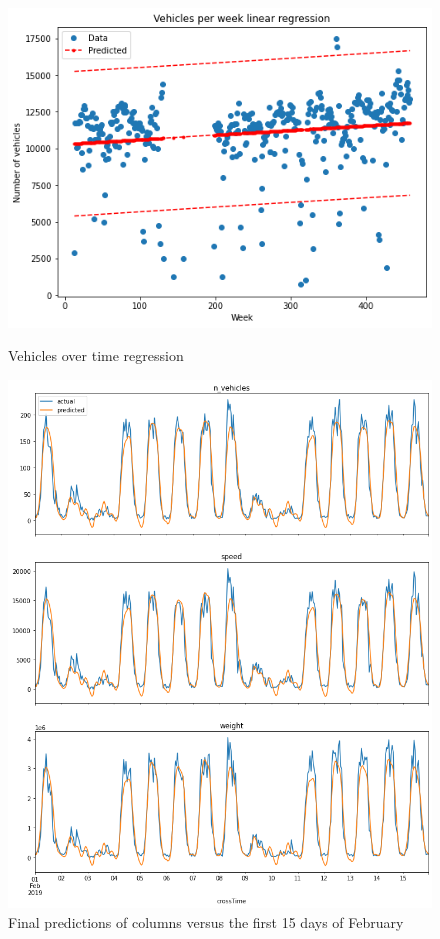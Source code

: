 \documentclass[10pt,conference,compsocconf]{IEEEtran}
\begin{document}
\begin{figure}[ht]
    \centering
    \includegraphics[scale=0.46]{report/img/vehicles-over-time.png}
    \caption{Vehicles over time regression}
    \label{vehicles-over-time}
    \bigbreak
    \includegraphics[scale=0.35]{report/img/final-predictions.png}
    \caption{Final predictions of columns versus the first 15 days of February}
    \label{final-predictions}
\end{figure}
\end{document}
